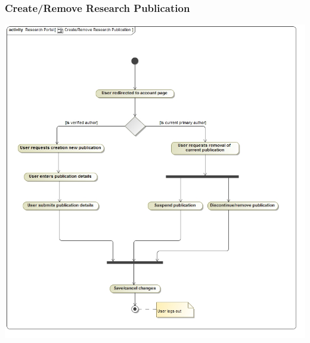 \documentclass[hidelinks,a4paper,12pt]{article}
\begin{document}
		\subsubsection{Create/Remove Research Publication}
			\includegraphics[width=1\textwidth]{./Graphs/CreateRemoveResearchPublication.png}\\[0.4cm]
	
\end{document}
